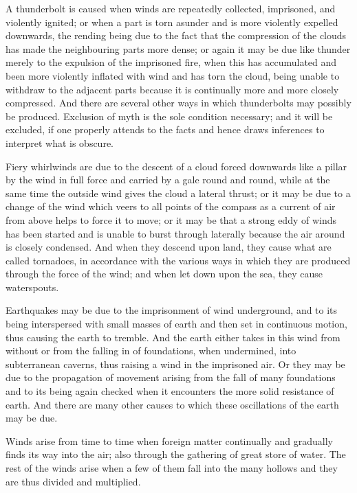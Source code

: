 \documentclass{stex}
\begin{document}
A thunderbolt is caused when winds are repeatedly collected, imprisoned, and violently ignited; or when a part is torn asunder and is more violently expelled downwards, the rending being due to the fact that the compression of the clouds has made the neighbouring parts more dense; or again it may be due like thunder merely to the expulsion of the imprisoned fire, when this has accumulated and been more violently inflated with wind and has torn the cloud, being unable to withdraw to the adjacent parts because it is continually more and more closely compressed.
And there are several other ways in which thunderbolts may possibly be produced.
Exclusion of myth is the sole condition necessary; and it will be excluded, if one properly attends to the facts and hence draws inferences to interpret what is obscure.

Fiery whirlwinds are due to the descent of a cloud forced downwards like a pillar by the wind in full force and carried by a gale round and round, while at the same time the outside wind gives the cloud a lateral thrust; or it may be due to a change of the wind which veers to all points of the compass as a current of air from above helps to force it to move; or it may be that a strong eddy of winds has been started and is unable to burst through laterally because the air around is closely condensed.
And when they descend upon land, they cause what are called tornadoes, in accordance with the various ways in which they are produced through the force of the wind; and when let down upon the sea, they cause waterspouts.

Earthquakes may be due to the imprisonment of wind underground, and to its being interspersed with small masses of earth and then set in continuous motion, thus causing the earth to tremble.
And the earth either takes in this wind from without or from the falling in of foundations, when undermined, into subterranean caverns, thus raising a wind in the imprisoned air.
Or they may be due to the propagation of movement arising from the fall of many foundations and to its being again checked when it encounters the more solid resistance of earth.
And there are many other causes to which these oscillations of the earth may be due.

Winds arise from time to time when foreign matter continually and gradually finds its way into the air; also through the gathering of great store of water.
The rest of the winds arise when a few of them fall into the many hollows and they are thus divided and multiplied.
\end{document}
